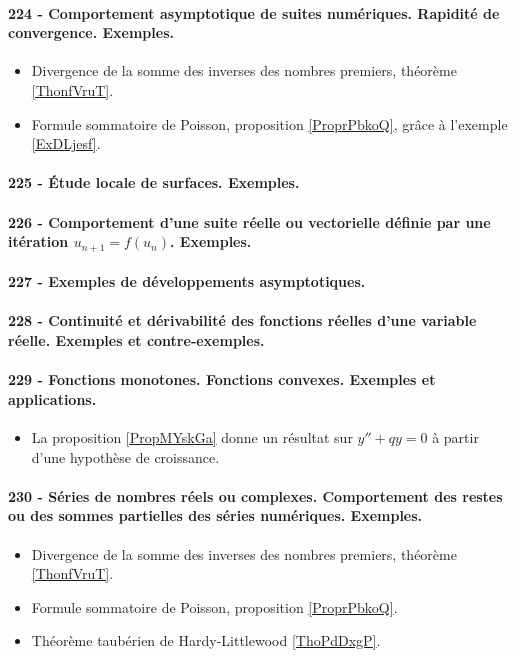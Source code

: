 \paragraph{224 - Comportement asymptotique de suites numériques. Rapidité de convergence. Exemples.}
\begin{itemize}
    \item Divergence de la somme des inverses des nombres premiers, théorème \ref{ThonfVruT}.
    \item Formule sommatoire de Poisson, proposition \ref{ProprPbkoQ}, grâce à l'exemple \ref{ExDLjesf}.
\end{itemize}
\paragraph{225 - Étude locale de surfaces. Exemples.}
\paragraph{226 - Comportement d’une suite réelle ou vectorielle définie par une itération \( u_{n+1}=f(u_n)\). Exemples.}
\paragraph{227 - Exemples de développements asymptotiques.}
\paragraph{228 - Continuité et dérivabilité des fonctions réelles d’une variable réelle. Exemples et contre-exemples.}
\paragraph{229 - Fonctions monotones. Fonctions convexes. Exemples et applications.}
\begin{itemize}
    \item La proposition \ref{PropMYskGa} donne un résultat sur \( y''+qy=0\) à partir d'une hypothèse de croissance.
\end{itemize}
\paragraph{230 - Séries de nombres réels ou complexes. Comportement des restes ou des sommes partielles des séries numériques. Exemples.}
\begin{itemize}
    \item Divergence de la somme des inverses des nombres premiers, théorème \ref{ThonfVruT}.
    \item Formule sommatoire de Poisson, proposition \ref{ProprPbkoQ}.
    \item Théorème taubérien de Hardy-Littlewood \ref{ThoPdDxgP}.
\end{itemize}
